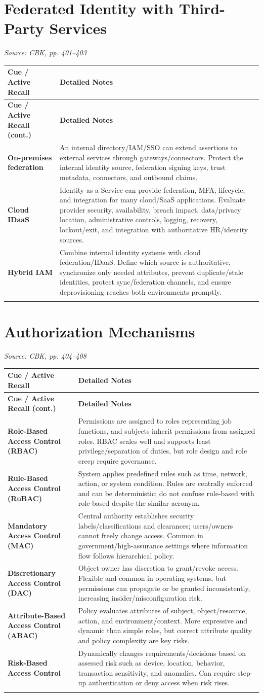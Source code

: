 \documentclass[10pt,letterpaper]{article}
\makeatletter
\newenvironment{cornell}{\rowcolors{2}{white}{notebg}\begin{longtable}{@{}>{\raggedright\arraybackslash\columncolor{cuebg}\color{navy}\bfseries}p{0.285\textwidth}>{\raggedright\arraybackslash}p{0.65\textwidth}@{}}\rowcolor{navy}\color{white}\textbf{Cue / Active Recall} & \color{white}\textbf{Detailed Notes}\\ \hline\endfirsthead\rowcolor{navy}\color{white}\textbf{Cue / Active Recall (cont.)} & \color{white}\textbf{Detailed Notes}\\ \hline\endhead}{\end{longtable}}
\newcommand{\noterow}[2]{#1 & #2\\\arrayrulecolor{line}\hline}\newcommand{\source}[1]{\par{\footnotesize\color{teal}\textit{Source: CBK, #1}}\par}
\makeatother
\begin{document}
\section{\color{navy}Federated Identity with Third-Party Services}
\source{pp. 401--403}
\begin{cornell}
\noterow{On-premises federation}{An internal directory/IAM/SSO can extend assertions to external services through gateways/connectors. Protect the internal identity source, federation signing keys, trust metadata, connectors, and outbound claims.}
\noterow{Cloud IDaaS}{Identity as a Service can provide federation, MFA, lifecycle, and integration for many cloud/SaaS applications. Evaluate provider security, availability, breach impact, data/privacy location, administrative controls, logging, recovery, lockout/exit, and integration with authoritative HR/identity sources.}
\noterow{Hybrid IAM}{Combine internal identity systems with cloud federation/IDaaS. Define which source is authoritative, synchronize only needed attributes, prevent duplicate/stale identities, protect sync/federation channels, and ensure deprovisioning reaches both environments promptly.}
\end{cornell}

\section{\color{navy}Authorization Mechanisms}
\source{pp. 404--408}
\begin{cornell}
\noterow{Role-Based Access Control (RBAC)}{Permissions are assigned to roles representing job functions, and subjects inherit permissions from assigned roles. RBAC scales well and supports least privilege/separation of duties, but role design and role creep require governance.}
\noterow{Rule-Based Access Control (RuBAC)}{System applies predefined rules such as time, network, action, or system condition. Rules are centrally enforced and can be deterministic; do not confuse rule-based with role-based despite the similar acronym.}
\noterow{Mandatory Access Control (MAC)}{Central authority establishes security labels/classifications and clearances; users/owners cannot freely change access. Common in government/high-assurance settings where information flow follows hierarchical policy.}
\noterow{Discretionary Access Control (DAC)}{Object owner has discretion to grant/revoke access. Flexible and common in operating systems, but permissions can propagate or be granted inconsistently, increasing insider/misconfiguration risk.}
\noterow{Attribute-Based Access Control (ABAC)}{Policy evaluates attributes of subject, object/resource, action, and environment/context. More expressive and dynamic than simple roles, but correct attribute quality and policy complexity are key risks.}
\noterow{Risk-Based Access Control}{Dynamically changes requirements/decisions based on assessed risk such as device, location, behavior, transaction sensitivity, and anomalies. Can require step-up authentication or deny access when risk rises.}
\end{cornell}
\end{document}
